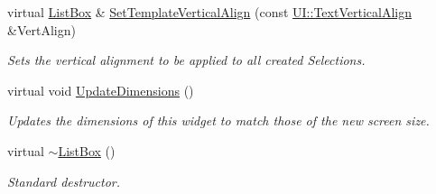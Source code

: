 \begin{DoxyCompactItemize}
virtual \hyperlink{classMezzanine_1_1UI_1_1ListBox}{ListBox} \& \hyperlink{classMezzanine_1_1UI_1_1ListBox_a985a72063a7aa760c2aebd562b7adfa9}{SetTemplateVerticalAlign} (const \hyperlink{namespaceMezzanine_1_1UI_ab35e3845e2541698245262cc17147ae9}{UI::TextVerticalAlign} \&VertAlign)
\begin{DoxyCompactList}\small\item\em Sets the vertical alignment to be applied to all created Selections. \item\end{DoxyCompactList}\item 
virtual void \hyperlink{classMezzanine_1_1UI_1_1ListBox_a7bad6cce9fa22e882cc74f62a51fabdb}{UpdateDimensions} ()
\begin{DoxyCompactList}\small\item\em Updates the dimensions of this widget to match those of the new screen size. \item\end{DoxyCompactList}\item 
\hypertarget{classMezzanine_1_1UI_1_1ListBox_a1fa312d9bc349a7a3b254afde3de81bd}{
virtual \hyperlink{classMezzanine_1_1UI_1_1ListBox_a1fa312d9bc349a7a3b254afde3de81bd}{$\sim$ListBox} ()}
\label{classMezzanine_1_1UI_1_1ListBox_a1fa312d9bc349a7a3b254afde3de81bd}

\begin{DoxyCompactList}\small\item\em Standard destructor. \item\end{DoxyCompactList}\end{DoxyCompactItemize}
